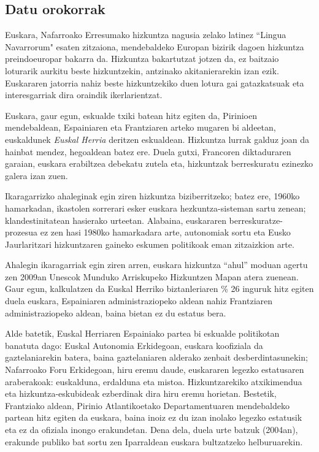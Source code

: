 \begin{multicols}{2}

\subsection{Datu orokorrak}

    Euskara, Nafarroako Erresumako hizkuntza nagusia zelako latinez “Lingua Navarrorum" esaten zitzaiona, mendebaldeko Europan bizirik dagoen hizkuntza preindoeuropar bakarra da. Hizkuntza bakartutzat jotzen da, ez baitzaio loturarik aurkitu beste hizkuntzekin, antzinako akitanierarekin izan ezik. Euskararen jatorria nahiz beste hizkuntzekiko duen lotura gai gatazkatsuak eta interesgarriak dira oraindik ikerlarientzat.


Euskara, gaur egun, eskualde txiki batean hitz egiten da, Pirinioen mendebaldean, Espainiaren eta Frantziaren arteko mugaren bi aldeetan, euskaldunek \textit{Euskal Herria} deritzen eskualdean. Hizkuntza lurrak galduz joan da hainbat mendez, hegoaldean batez ere. Duela gutxi, Francoren diktaduraren garaian, euskara erabiltzea debekatu zutela eta, hizkuntzak berreskuratu ezinezko galera izan zuen. 

Ikaragarrizko ahaleginak egin ziren hizkuntza biziberritzeko; batez ere, 1960ko hamarkadan, ikastolen sorrerari esker euskara hezkuntza-sisteman sartu zenean; klandestinitatean hasierako urteetan. Alabaina, euskararen berreskuratze-prozesua ez zen hasi 1980ko hamarkadara arte, autonomiak sortu eta Eusko Jaurlaritzari hizkuntzaren gaineko eskumen politikoak eman zitzaizkion arte. 

Ahalegin ikaragarriak egin ziren arren, euskara hizkuntza “ahul” moduan agertu zen 2009an Unescok Munduko Arriskupeko Hizkuntzen Mapan \cite{BAS-Nota5}  atera zuenean. Gaur egun, kalkulatzen da Euskal Herriko biztanleriaren \cite{BAS-Nota6}   \% 26 inguruk hitz egiten duela euskara, Espainiaren administraziopeko aldean nahiz Frantziaren administraziopeko aldean, baina bietan ez du estatus bera. 

Alde batetik, Euskal Herriaren Espainiako partea bi eskualde politikotan banatuta dago: Euskal Autonomia Erkidegoan, euskara koofiziala da gaztelaniarekin batera, baina gaztelaniaren alderako zenbait desberdintasunekin; Nafarroako Foru Erkidegoan, hiru eremu daude, euskararen legezko estatusaren araberakoak: euskalduna, erdalduna eta mistoa. Hizkuntzarekiko atxikimendua eta hizkuntza-eskubideak ezberdinak dira hiru eremu horietan. 
Bestetik, Frantziako aldean, Pirinio Atlantikoetako Departamentuaren mendebaldeko partean hitz egiten da euskara, baina inoiz ez du izan inolako legezko estatusik eta ez da ofiziala inongo erakundetan. Dena dela, duela urte batzuk (2004an), erakunde publiko bat sortu zen Iparraldean euskara bultzatzeko helburuarekin.


\end{multicols}

